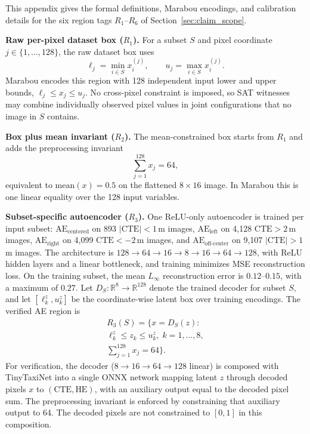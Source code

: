 \documentclass[twocolumn,smallextended,runningheads]{svjour3}
\begin{document}
This appendix gives the formal definitions, Marabou encodings, and calibration details for the six region tags $R_1$--$R_6$ of Section~\ref{sec:claim_scope}.

\textbf{Raw per-pixel dataset box ($R_1$).} For a subset $S$ and pixel coordinate $j \in \{1,\ldots,128\}$, the raw dataset box uses
\[
\ell_j=\min_{i\in S} x_i^{(j)}, \qquad u_j=\max_{i\in S} x_i^{(j)} .
\]
Marabou encodes this region with 128 independent input lower and upper bounds, $\ell_j \le x_j \le u_j$. No cross-pixel constraint is imposed, so SAT witnesses may combine individually observed pixel values in joint configurations that no image in $S$ contains.

\textbf{Box plus mean invariant ($R_2$).} The mean-constrained box starts from $R_1$ and adds the preprocessing invariant
\[
\sum_{j=1}^{128} x_j = 64 ,
\]
equivalent to $\mathrm{mean}(x)=0.5$ on the flattened $8{\times}16$ image. In Marabou this is one linear equality over the 128 input variables.

\textbf{Subset-specific autoencoder ($R_3$).} One ReLU-only autoencoder is trained per input subset: $\mathrm{AE}_{\text{centered}}$ on 893 $|\text{CTE}|<1$\,m images, $\mathrm{AE}_{\text{left}}$ on 4{,}128 $\text{CTE}>2$\,m images, $\mathrm{AE}_{\text{right}}$ on 4{,}099 $\text{CTE}<{-}2$\,m images, and $\mathrm{AE}_{\text{off-center}}$ on 9{,}107 $|\text{CTE}|>1$\,m images. The architecture is $128 \to 64 \to 16 \to 8 \to 16 \to 64 \to 128$, with ReLU hidden layers and a linear bottleneck, and training minimizes MSE reconstruction loss. On the training subset, the mean $L_\infty$ reconstruction error is $0.12$--$0.15$, with a maximum of $0.27$. Let $D_S:\mathbb{R}^8\to\mathbb{R}^{128}$ denote the trained decoder for subset $S$, and let $[\ell^z_k,u^z_k]$ be the coordinate-wise latent box over training encodings. The verified AE region is
\begin{multline*}
R_3(S)=\{x=D_S(z): \\
\ell^z_k\le z_k\le u^z_k,\; k=1,\ldots,8, \\
\textstyle\sum_{j=1}^{128}x_j=64\}.
\end{multline*}
For verification, the decoder ($8 \to 16 \to 64 \to 128$ linear) is composed with TinyTaxiNet into a single ONNX network mapping latent $z$ through decoded pixels $x$ to $(\text{CTE}, \text{HE})$, with an auxiliary output equal to the decoded pixel sum. The preprocessing invariant is enforced by constraining that auxiliary output to 64. The decoded pixels are not constrained to $[0,1]$ in this composition.
\end{document}

